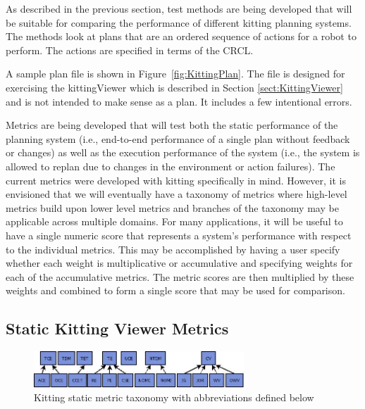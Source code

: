 As described in the previous section, test methods are being developed that
will be suitable for comparing the performance of different kitting
planning systems. The methods look at plans that are an ordered sequence
of actions for a robot to perform. The actions are specified in terms of
the CRCL.

A sample plan file is shown in Figure~\ref{fig:KittingPlan}. The file is
designed for exercising the kittingViewer which is described in Section \ref{sect:KittingViewer}
and is not intended to make sense
as a plan. It includes a few intentional errors.

Metrics are being developed that will test both the static performance of the planning system
(i.e., end-to-end performance of a single plan without feedback or changes) as well as the
execution performance of the system (i.e., the system is allowed to replan due to changes
in the environment or action failures). The current metrics were developed with
kitting specifically in mind. However, it is envisioned that we will eventually have
a taxonomy of metrics where high-level metrics build upon lower level metrics and
branches of the taxonomy may be applicable across multiple domains. For many
applications, it will be useful to have a single numeric score that represents a system\rq{}s
performance with respect to the individual metrics. This may be accomplished by having a
user specify whether each weight is multiplicative or accumulative and specifying
weights for each of the accumulative metrics. The metric scores are then multiplied by
these weights and combined to form a single score that may be used for comparison.

\subsection{Static Kitting Viewer Metrics}
\begin{figure}[ht!]
		\begin{center}
			\includegraphics[width=3.1in]{images/MetricTaxonomy.jpg}
		\end{center}

	\caption{Kitting static metric taxonomy with abbreviations defined below}
	\label{fig:StaticMetricTax}
\end{figure}

